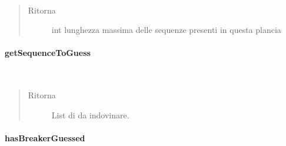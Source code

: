 \documentclass[letterpaper,10pt,italian,openany,oneside]{sphinxmanual}
\begin{document}
\begin{fulllineitems}
\label{\detokenize{source/it/unicam/cs/pa/mastermind/gamecore/BoardModel:it.unicam.cs.pa.mastermind.gamecore.BoardModel.getSequenceLength()}}~\begin{quote}\begin{description}
\item[{Ritorna}] \leavevmode
int lunghezza massima delle sequenze presenti in questa plancia

\end{description}\end{quote}

\end{fulllineitems}



\paragraph{getSequenceToGuess}
\label{\detokenize{source/it/unicam/cs/pa/mastermind/gamecore/BoardModel:getsequencetoguess}}

\begin{fulllineitems}
\label{\detokenize{source/it/unicam/cs/pa/mastermind/gamecore/BoardModel:it.unicam.cs.pa.mastermind.gamecore.BoardModel.getSequenceToGuess()}}~\begin{quote}\begin{description}
\item[{Ritorna}] \leavevmode
List di  da indovinare.

\end{description}\end{quote}

\end{fulllineitems}



\paragraph{hasBreakerGuessed}
\label{\detokenize{source/it/unicam/cs/pa/mastermind/gamecore/BoardModel:hasbreakerguessed}}
\end{document}
